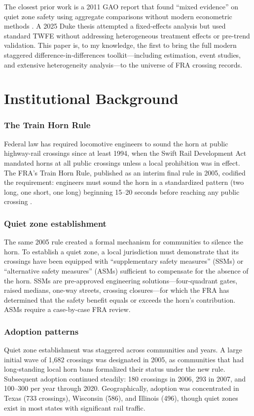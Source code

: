 \documentclass[12pt]{article}
\begin{document}
The closest prior work is a 2011 GAO report that found ``mixed evidence'' on quiet zone safety using aggregate comparisons without modern econometric methods \citep{gao2011train}. A 2025 Duke thesis attempted a fixed-effects analysis but used standard TWFE without addressing heterogeneous treatment effects or pre-trend validation. This paper is, to my knowledge, the first to bring the full modern staggered difference-in-differences toolkit---including \citet{callaway2021difference} estimation, \citet{sun2021estimating} event studies, and extensive heterogeneity analysis---to the universe of FRA crossing records.


\section{Institutional Background}

\subsubsection*{The Train Horn Rule} Federal law has required locomotive engineers to sound the horn at public highway-rail crossings since at least 1994, when the Swift Rail Development Act mandated horns at all public crossings unless a local prohibition was in effect. The FRA's Train Horn Rule, published as an interim final rule in 2005, codified the requirement: engineers must sound the horn in a standardized pattern (two long, one short, one long) beginning 15--20 seconds before reaching any public crossing \citep{fra2006interim}.

\subsubsection*{Quiet zone establishment} The same 2005 rule created a formal mechanism for communities to silence the horn. To establish a quiet zone, a local jurisdiction must demonstrate that its crossings have been equipped with ``supplementary safety measures'' (SSMs) or ``alternative safety measures'' (ASMs) sufficient to compensate for the absence of the horn. SSMs are pre-approved engineering solutions---four-quadrant gates, raised medians, one-way streets, crossing closures---for which the FRA has determined that the safety benefit equals or exceeds the horn's contribution. ASMs require a case-by-case FRA review.

\subsubsection*{Adoption patterns} Quiet zone establishment was staggered across communities and years. A large initial wave of 1,682 crossings was designated in 2005, as communities that had long-standing local horn bans formalized their status under the new rule. Subsequent adoption continued steadily: 180 crossings in 2006, 293 in 2007, and 100--300 per year through 2020. Geographically, adoption was concentrated in Texas (733 crossings), Wisconsin (586), and Illinois (496), though quiet zones exist in most states with significant rail traffic.
\end{document}
